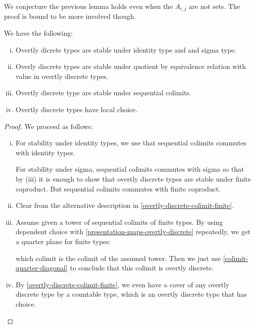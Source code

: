 \begin{remark}
We conjecture the previous lemma holds even when the $A_{i,j}$ are not sets. The proof is bound to be more involved though.
\end{remark}

\begin{theorem}
We have the following:
\begin{enumerate}[(i)]
\item Overtly dicrete types are stable under identity type and and sigma type.
\item Overly discrete types are stable under quotient by equivalence relation with value in overtly discrete types.
\item Overtly discrete type are stable under sequential colimits.
\item Overtly discrete types have local choice.
\end{enumerate}
\end{theorem}

\begin{proof}
We proceed as follows:
\begin{enumerate}[(i)]
\item For stability under identity types, we use that sequential colimits commutes with identity types. 

For stability under sigma, sequential colimits commutes with sigma so that by (iii) it is enough to show that overtly discrete types are stable under finite coproduct. But sequential colimits commutes with finite coproduct.

\item Clear from the alternative description in \cref{overtly-discrete-colimit-finite}.

\item Assume given a tower of sequential colimits of finite types. By using dependent choice with \cref{presentation-maps-overtly-discrete} repeatedly, we get a quarter plane for finite types:
\begin{center}
\end{center}
which colimit is the colimit of the assumed tower. Then we just use \cref{colimit-quarter-diagonal} to conclude that this colimit is overtly discrete.

\item By \cref{overtly-discrete-colimit-finite}, we even have a cover of any overtly discrete type by a countable type, which is an overtly discrete type that has choice.
\end{enumerate}
\end{proof}


